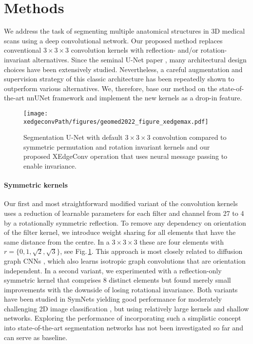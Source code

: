 \section{Methods}
    We address the task of segmenting multiple anatomical structures in 3D medical scans using a deep convolutional network. Our proposed method replaces conventional $3\times3\times3$ convolution kernels with reflection- and/or rotation-invariant alternatives. Since the seminal U-Net paper \citep{ronneberger2015u}, many architectural design choices have been extensively studied. Nevertheless, a careful augmentation and supervision strategy of this classic architecture has been repeatedly shown to outperform various alternatives. We, therefore, base our method on the state-of-the-art nnUNet framework \citep{isensee2021nnu} and implement the new kernels as a drop-in feature.

    \begin{figure}
        \caption{
            Segmentation U-Net with default $3\times3\times3$  convolution compared to symmetric permutation and rotation invariant kernels  and our proposed XEdgeConv operation that uses neural message passing to enable invariance.
        }
        \label{fig:concept}
        \texttt{[image: \\xedgeconvPath/figures/geomed2022\_figure\_xedgemax.pdf]}
    \end{figure}
    \paragraph{Symmetric kernels} Our first and most straightforward modified variant of the convolution kernels  uses a reduction of learnable parameters for each filter and channel from 27 to 4 by a rotationally symmetric reflection. To remove any dependency on orientation of the filter kernel, we introduce weight sharing for all elements that have the same distance from the centre. In a $3\times3\times3$ these are four elements with $r=\{0,1,\sqrt{2},\sqrt{3}\}$, see Fig.\,\ref{fig:concept}. This approach is most closely related to diffusion graph CNNs \citep{atwood2016diffusion}, which also learns isotropic graph convolutions that are orientation independent. In a second variant, we experimented with a reflection-only symmetric kernel that comprises 8 distinct elements but found merely small improvements with the downside of losing rotational invariance. Both variants have been studied in SymNets yielding good performance for moderately challenging 2D image classification \citep{dzhezyan2021symmetrical}, but using relatively large kernels and shallow networks.
    Exploring the performance of incorporating such a simplistic concept into state-of-the-art segmentation networks has not been investigated so far and can serve as baseline.

